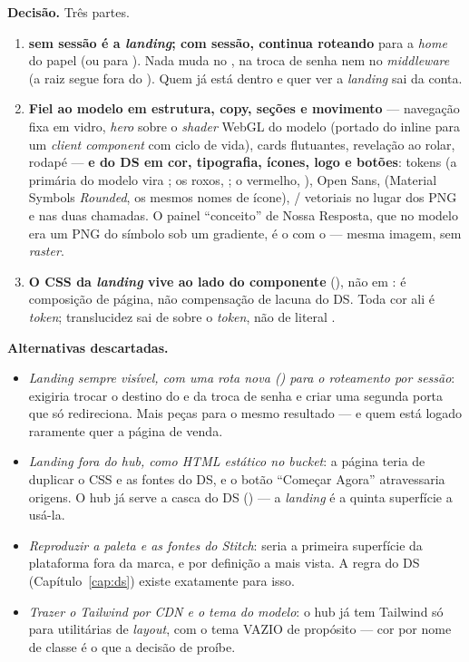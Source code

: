 \textbf{Decisão.} Três partes.

\begin{enumerate}
  \item \textbf{\rota{/} sem sessão é a \emph{landing}; com sessão, continua
    roteando} para a \emph{home} do papel (ou para ). Nada
    muda no , na troca de senha nem no \emph{middleware} (a raiz
    segue fora do ). Quem já está dentro e quer ver a \emph{landing}
    sai da conta.
  \item \textbf{Fiel ao modelo em estrutura, copy, seções e movimento} ---
    navegação fixa em vidro, \emph{hero} sobre o \emph{shader} WebGL do modelo
    (portado do  inline para um \emph{client component} com ciclo
    de vida), cards flutuantes, revelação ao rolar, rodapé --- \textbf{e do DS em
    cor, tipografia, ícones, logo e botões}: tokens  (a primária
    do modelo vira ; os roxos, ; o
    vermelho, ), Open Sans,  (Material Symbols
    \emph{Rounded}, os mesmos nomes de ícone), /
    vetoriais no lugar dos PNG e  nas duas chamadas. O painel
    ``conceito'' de Nossa Resposta, que no modelo era um PNG do símbolo sob um
    gradiente, é o  com o  ---
    mesma imagem, sem \emph{raster}.
  \item \textbf{O CSS da \emph{landing} vive ao lado do componente}
    (), não em : é
    composição de página, não compensação de lacuna do DS. Toda cor ali é
    \emph{token}; translucidez sai de  sobre o \emph{token}, não
    de literal .
\end{enumerate}

\textbf{Alternativas descartadas.}
\begin{itemize}
  \item \emph{Landing sempre visível, com uma rota nova () para o
    roteamento por sessão}: exigiria trocar o destino do  e da
    troca de senha e criar uma segunda porta que só redireciona. Mais peças
    para o mesmo resultado --- e quem está logado raramente quer a página de
    venda.
  \item \emph{Landing fora do hub, como HTML estático no \emph{bucket}}: a
    página teria de duplicar o CSS e as fontes do DS, e o botão ``Começar
    Agora'' atravessaria origens. O hub já serve a casca do DS
    () --- a \emph{landing} é a quinta superfície a usá-la.
  \item \emph{Reproduzir a paleta e as fontes do Stitch}: seria a primeira
    superfície da plataforma fora da marca, e por definição a mais vista. A
    regra do DS (Capítulo~\ref{cap:ds}) existe exatamente para isso.
  \item \emph{Trazer o Tailwind por CDN e o tema do modelo}: o hub já tem
    Tailwind só para utilitárias de \emph{layout}, com o tema VAZIO de
    propósito --- cor por nome de classe é o que a decisão de
     proíbe.
\end{itemize}

